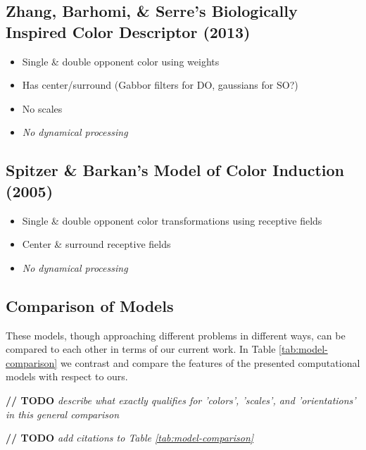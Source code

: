 \documentclass[journal,onecolumn]{IEEEtran}
\begin{document}
\subsection*{Zhang, Barhomi, \& Serre's Biologically Inspired Color Descriptor (2013)}
\begin{itemize}
    \item Single \& double opponent color using weights
    \item Has center/surround (Gabbor filters for DO, gaussians for SO?)
    \item No scales
    \item \textit{No dynamical processing}
\end{itemize}


\subsection*{Spitzer \& Barkan's Model of Color Induction (2005)}
\begin{itemize}
    \item Single \& double opponent color transformations using receptive fields
    \item Center \& surround receptive fields
    \item \textit{No dynamical processing}
\end{itemize}

\subsection*{Comparison of Models}
These models, though approaching different problems in different ways, can be compared to each other in terms of our current work. In Table \ref{tab:model-comparison} we contrast and compare the features of the presented computational models with respect to ours.

\textbf{// TODO} \textit{describe what exactly qualifies for 'colors', 'scales', and 'orientations' in this general comparison}

\textbf{// TODO} \textit{add citations to Table \ref{tab:model-comparison}}
\end{document}
